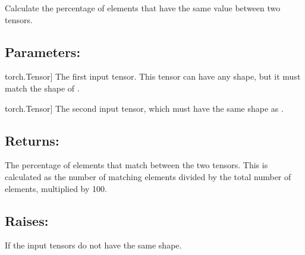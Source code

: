 \documentclass[a4paper,10pt,english]{sphinxmanual}
\begin{document}
\begin{fulllineitems}
\label{\detokenize{utils:fireDiff.Utils.utilities.calculate_matching_percentage}}
\pysigstartsignatures
{}
\pysigstopsignatures
\sphinxAtStartPar
Calculate the percentage of elements that have the same value between two
tensors.


\subsection{Parameters:}
\label{\detokenize{utils:parameters}}\begin{description}
\sphinxlineitem{tensor1}{[}torch.Tensor{]}
\sphinxAtStartPar
The first input tensor. This tensor can have any shape, but it must
match the shape of .

\sphinxlineitem{tensor2}{[}torch.Tensor{]}
\sphinxAtStartPar
The second input tensor, which must have the same shape as .

\end{description}


\subsection{Returns:}
\label{\detokenize{utils:returns}}\begin{description}
\sphinxAtStartPar
The percentage of elements that match between the two tensors. This is
calculated as the number of matching elements divided by the total
number of elements, multiplied by 100.

\end{description}


\subsection{Raises:}
\label{\detokenize{utils:raises}}\begin{description}
\sphinxAtStartPar
If the input tensors do not have the same shape.

\end{description}



\end{fulllineitems}
\end{document}
